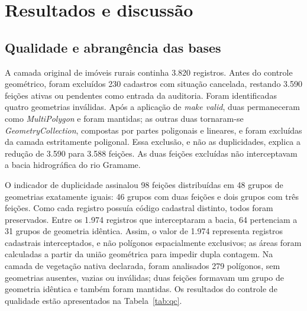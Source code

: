 
\section{Resultados e discussão}

\subsection{Qualidade e abrangência das bases}

A camada original de imóveis rurais continha 3.820 registros. Antes do controle geométrico, foram excluídos 230 cadastros com situação cancelada, restando 3.590 feições ativas ou pendentes como entrada da auditoria. Foram identificadas quatro geometrias inválidas. Após a aplicação de \textit{make valid}, duas permaneceram como \textit{MultiPolygon} e foram mantidas; as outras duas tornaram-se \textit{GeometryCollection}, compostas por partes poligonais e lineares, e foram excluídas da camada estritamente poligonal. Essa exclusão, e não as duplicidades, explica a redução de 3.590 para 3.588 feições. As duas feições excluídas não interceptavam a bacia hidrográfica do rio Gramame.

O indicador de duplicidade assinalou 98 feições distribuídas em 48 grupos de geometrias exatamente iguais: 46 grupos com duas feições e dois grupos com três feições. Como cada registro possuía código cadastral distinto, todos foram preservados. Entre os 1.974 registros que interceptaram a bacia, 64 pertenciam a 31 grupos de geometria idêntica. Assim, o valor de 1.974 representa registros cadastrais interceptados, e não polígonos espacialmente exclusivos; as áreas foram calculadas a partir da união geométrica para impedir dupla contagem. Na camada de vegetação nativa declarada, foram analisados 279 polígonos, sem geometrias ausentes, vazias ou inválidas; duas feições formavam um grupo de geometria idêntica e também foram mantidas. Os resultados do controle de qualidade estão apresentados na Tabela~\ref{tab:qc}.



